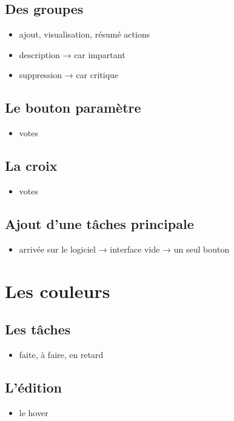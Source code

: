 \documentclass[11pt]{article}
\begin{document}
\subsection{Des groupes}
\begin{itemize}
\item ajout, visualisation, résumé actions
\item description → car impartant
\item suppression → car critique
\end{itemize}


\subsection{Le bouton paramètre}
\begin{itemize}
\item votes
\end{itemize}


\subsection{La croix}
\begin{itemize}
\item votes
\end{itemize}


\subsection{Ajout d'une tâches principale}
\begin{itemize}
\item arrivée sur le logiciel → interface vide → un seul bouton
\end{itemize}


\section{Les couleurs}


\subsection{Les tâches}
\begin{itemize}
\item faite, à faire, en retard
\end{itemize}


\subsection{L'édition}
\begin{itemize}
\item le hover
\end{itemize}
\end{document}
